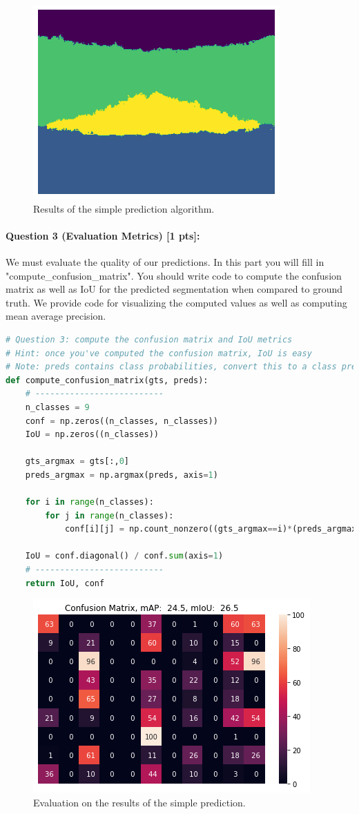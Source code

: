 \documentclass[11pt]{article}
\begin{document}
\begin{figure}[h]
    \centering
    \includegraphics[width=0.5\linewidth]{simple_predict.png}
    \caption{Results of the simple prediction algorithm.}
    \label{fig:simple-predict}
\end{figure}

\paragraph{Question 3 (Evaluation Metrics) [1 pts]:}  
We must evaluate the quality of our predictions. In this part you will fill in "compute\_confusion\_matrix". You should write code to compute the confusion matrix as well as IoU for the predicted segmentation when compared to ground truth. We provide code for visualizing the computed values as well as computing mean average precision.

\begin{lstlisting}[language=Python, basicstyle=\scriptsize]
# Question 3: compute the confusion matrix and IoU metrics
# Hint: once you've computed the confusion matrix, IoU is easy
# Note: preds contains class probabilities, convert this to a class prediction
def compute_confusion_matrix(gts, preds):
    # --------------------------
    n_classes = 9
    conf = np.zeros((n_classes, n_classes))
    IoU = np.zeros((n_classes))
    
    gts_argmax = gts[:,0]
    preds_argmax = np.argmax(preds, axis=1)

    for i in range(n_classes):
        for j in range(n_classes):
            conf[i][j] = np.count_nonzero((gts_argmax==i)*(preds_argmax==j))
    
    IoU = conf.diagonal() / conf.sum(axis=1)
    # --------------------------
    return IoU, conf
\end{lstlisting}

\begin{figure}[h]
    \centering
    \includegraphics[width=0.5\linewidth]{eval_simple_predict.png}
    \caption{Evaluation on the results of the simple prediction.}
    \label{fig:eval-simple-predict}
\end{figure}
\end{document}
